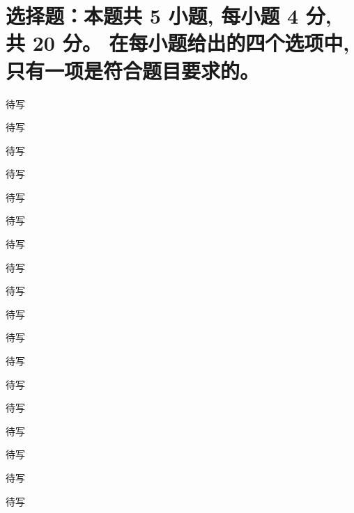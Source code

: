 \fi




\section{%
  选择题：本题共 5 小题, 每小题 4 分, 共 20 分。
  在每小题给出的四个选项中, 只有一项是符合题目要求的。
}


\begin{question}
  待写 \paren[]

  \begin{choices}
    \item 待写
    \item 待写
    \item 待写
    \item 待写
  \end{choices}
\end{question}

\begin{solution}
  待写
\end{solution}

\begin{question}
  待写 \paren[]

  \begin{choices}
    \item 待写
    \item 待写
    \item 待写
    \item 待写
  \end{choices}
\end{question}

\begin{solution}
  待写
\end{solution}

\begin{question}
  待写 \paren[]

  \begin{choices}
    \item 待写
    \item 待写
    \item 待写
    \item 待写
  \end{choices}
\end{question}

\begin{solution}
  待写
\end{solution}

